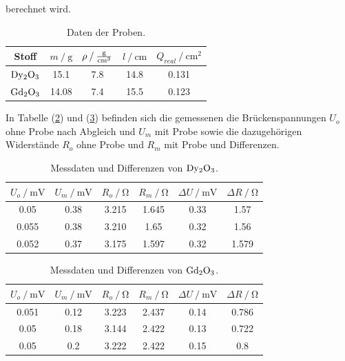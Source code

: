 \noindent
berechnet wird.

\begin{table}
    \centering
    \caption{Daten der Proben.}
    \begin{tabular}{c c c c c}
        \toprule
        {Stoff} & {$m \mathbin{/} \si{\gram}$} & {$\rho \mathbin{/} \si[per-mode=fraction]{\gram\per\cubic\centi\meter}$} & {$l \mathbin{/} \si{\centi\meter}$} & {$Q_{real} \mathbin{/} \si{\centi\meter\squared}$} \\
    \midrule
    $\ce{Dy2O3}$ & 15.1  & 7.8 & 14.8 & 0.131 \\
    $\ce{Gd2O3}$ & 14.08 & 7.4 & 15.5 & 0.123 \\
    \bottomrule
\end{tabular}
\label{tab:proben}
\end{table}

\noindent
In Tabelle (\ref{tab:exp1}) und (\ref{tab:exp2}) befinden sich die gemessenen die Brückenspannungen $U_o$ ohne Probe nach Abgleich und $U_m$ mit Probe sowie die dazugehörigen Widerstände
$R_o$ ohne Probe und $R_m$ mit Probe und Differenzen. 

\begin{table}
    \centering
    \caption{Messdaten und Differenzen von $\ce{Dy2O3}$.}
    \begin{tabular}{c c c c c c}
        \toprule
        {$U_o \mathbin{/} \si{\milli\volt}$} & {$U_m \mathbin{/} \si{\milli\volt}$} & {$R_o \mathbin{/} \si{\ohm}$} & {$R_m \mathbin{/} \si{\ohm}$} & {$\Delta U \mathbin{/} \si{\milli\volt}$} & {$\Delta R \mathbin{/} \si{\ohm}$} \\
    \midrule
    0.05     &   0.38   &     3.215     &     1.645    &   0.33  &  1.57  \\
    0.055    &   0.38   &     3.210     &     1.65     &   0.32  &  1.56  \\ 
    0.052    &   0.37   &     3.175     &     1.597    &   0.32  &  1.579 \\
    \bottomrule
\end{tabular}
\label{tab:exp1}
\end{table}

\begin{table}
    \centering
    \caption{Messdaten und Differenzen von $\ce{Gd2O3}$.}
    \begin{tabular}{c c c c c c}
        \toprule
        {$U_o \mathbin{/} \si{\milli\volt}$} & {$U_m \mathbin{/} \si{\milli\volt}$} & {$R_o \mathbin{/} \si{\ohm}$} & {$R_m \mathbin{/} \si{\ohm}$} & {$\Delta U \mathbin{/} \si{\milli\volt}$} & {$\Delta R \mathbin{/} \si{\ohm}$} \\
    \midrule
    0.051    &   0.12   &     3.223     &     2.437    &   0.14  &  0.786  \\
    0.05     &   0.18   &     3.144     &     2.422    &   0.13  &  0.722  \\ 
    0.05     &   0.2    &     3.222     &     2.422    &   0.15  &  0.8    \\
    \bottomrule
\end{tabular}
\label{tab:exp2}
\end{table}

